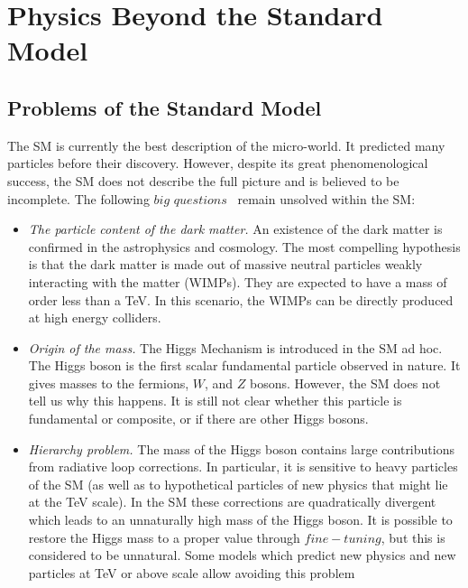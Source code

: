 \section{Physics Beyond the Standard Model}

\subsection{Problems of the Standard Model}

The SM is currently the best description of the micro-world. It predicted many particles before their discovery. However, despite its great phenomenological success, the SM does not describe the full picture and is believed to be incomplete. The following $big$ $questions$~\cite{Gershtein:2013iqa} remain unsolved within the SM:
\begin{itemize}
\item \textit{The particle content of the dark matter.} An existence of the dark matter is confirmed in the astrophysics and cosmology. The most compelling hypothesis is that the dark matter is made out of massive neutral particles weakly interacting with the matter (WIMPs). They are expected to have a mass of order less than a TeV. In this scenario, the WIMPs can be directly produced at high energy colliders.
\item \textit{Origin of the mass.} The Higgs Mechanism is introduced in the SM ad hoc. The Higgs boson is the first scalar fundamental particle observed in nature. It gives masses to the fermions, $W$, and $Z$ bosons. However, the SM does not tell us why this happens. It is still not clear whether this particle is fundamental or composite, or if there are other Higgs bosons.
\item \textit{Hierarchy problem.} The mass of the Higgs boson contains large contributions from radiative loop corrections. In particular, it is sensitive to heavy particles of the SM (as well as to hypothetical particles of new physics that might lie at the TeV scale). 
In the SM these corrections are quadratically divergent which leads to an unnaturally high mass of the Higgs boson. It is possible to restore the Higgs mass to a proper value through $fine-tuning$, but this is considered to be unnatural. Some models which predict new physics and new particles at TeV or above scale allow avoiding this problem

\end{itemize}
